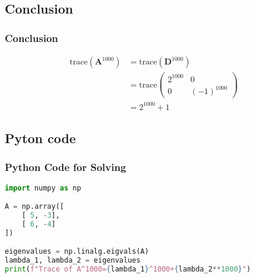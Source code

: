 \documentclass{beamer}
\providecommand{\brak}[1]{\ensuremath{\left(#1\right)}}
\theoremstyle{remark}
\newcommand{\myvec}[1]{\ensuremath{\begin{pmatrix}#1\end{pmatrix}}}
\let\vec\mathbf
\numberwithin{equation}{section}
\begin{document}
\subsection{Conclusion}
\begin{frame}
\frametitle{Conclusion}
   \begin{align}
     \text{trace}\brak{\vec{A}^{1000}}&=\text{trace}\brak{\vec{D}^{1000}} \\
&=\text{trace}\myvec{2^{1000}&0\\0&\brak{-1}^{1000}} \\
&=2^{1000}+1
 \end{align}
 \end{frame}
 \begin{frame}[fragile]
 \section{Pyton code}
\frametitle{Python Code for Solving}
\begin{lstlisting}[language=Python]
  import numpy as np

A = np.array([
    [ 5, -3],
    [ 6, -4]
])

eigenvalues = np.linalg.eigvals(A)
lambda_1, lambda_2 = eigenvalues
print(f"Trace of A^1000={lambda_1}^1000+{lambda_2**1000}")
\end{lstlisting}
\end{frame}
\end{document}
